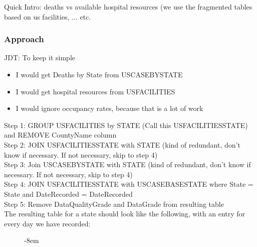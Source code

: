 \documentclass[11pt]{article}
\begin{document}
\noindent
Quick Intro: deaths vs available hospital resources (we use the fragmented tables based on us facilities,  ... etc.

\subsubsection{Approach}

\noindent
JDT: To keep it simple

\begin{itemize}
    \item I would get Deaths by State from USCASEBYSTATE
    \item I would get hospital resources from USFACILITIES
    \item I would ignore occupancy rates, because that is a lot of work
\end{itemize}

\noindent
Step 1: GROUP USFACILITIES by STATE (Call this USFACILITIESSTATE) and REMOVE CountyName column \\
\noindent
Step 2: JOIN USFACILITIESSTATE with STATE (kind of redundant, don't know if necessary. If not necessary, skip to step 4) \\
\noindent
Step 3: Join USCASEBYSTATE with STATE (kind of redundant, don't know if necessary. If not necessary, skip to step 4) \\
\noindent
Step 4: JOIN USFACILITIESSTATE with USCASEBASESTATE where State = State and DateRecorded = DateRecorded \\
\noindent
Step 5: Remove DataQualityGrade and DataGrade from resulting table \\

\noindent
The resulting table for a state should look like the following, with an entry for every day we have recorded:

\begin{figure}[H]
\begin{adjustwidth*}{}{-8em}
\centering
{}%
\end{adjustwidth*}
\end{figure}
\end{document}
